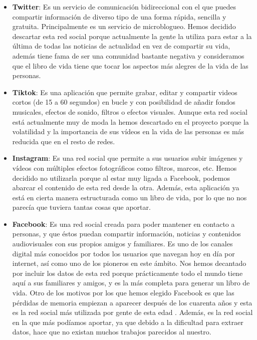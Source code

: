 	\begin{itemize}
		\item \textbf{Twitter}: Es un servicio de comunicación bidireccional con el que puedes compartir información de diverso tipo de una forma rápida, sencilla y gratuita. Principalmente es un servicio de microblogueo. Hemos decidido descartar esta red social porque actualmente la gente la utiliza para estar a la última de todas las noticias de actualidad en vez de compartir su vida, además tiene fama de ser una comunidad bastante negativa y consideramos que el libro de vida tiene que tocar los aspectos más alegres de la vida de las personas.
		
		\item \textbf{Tiktok}: Es una aplicación que permite grabar, editar y compartir videos cortos (de 15 a 60 segundos) en bucle y con posibilidad de añadir fondos musicales, efectos de sonido, filtros o efectos visuales. Aunque esta red social está actualmente muy de moda la hemos descartado en el proyecto porque la volatilidad y la importancia de sus vídeos en la vida de las personas es más reducida que en el resto de redes.
		
		\item \textbf{Instagram}: Es una red social que permite a sus usuarios subir imágenes y vídeos con múltiples efectos fotográficos como filtros, marcos, etc. Hemos decidido no utilizarla porque al estar muy ligada a Facebook, podemos abarcar el contenido de esta red desde la otra. Además, esta aplicación ya está en cierta manera estructurada como un libro de vida, por lo que no nos parecía que tuviera tantas cosas que aportar.
		
		\item \textbf{Facebook}: Es una red social creada para poder mantener en contacto a personas, y que éstos puedan compartir información, noticias y contenidos audiovisuales con sus propios amigos y familiares. Es uno de los canales digital más conocidos por todos los usuarios que navegan hoy en día por internet, así como uno de los pioneros en este ámbito. Nos hemos decantado por incluir los datos de esta red porque prácticamente todo el mundo tiene aquí a sus familiares y amigos, y es la más completa para generar un libro de vida. Otro de los motivos por los que hemos elegido Facebook es que las pérdidas de memoria empiezan a aparecer después de los cuarenta años y esta es la red social más utilizada por gente de esta edad \citep{Edad-redes-sociales}. Además, es la red social en la que más podíamos aportar, ya que debido a la dificultad para extraer datos, hace que no existan muchos trabajos parecidos al nuestro.
		

\end{itemize}
